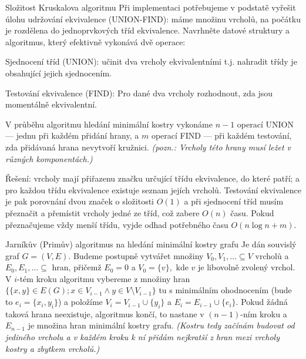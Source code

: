 \begin{vetaN}{Složitost Kruskalova algoritmu}
Při implementaci potřebujeme v podstatě vyřešit úlohu udržování ekvivalence (UNION-FIND): máme množinu vrcholů, na počátku je rozdělena do jednoprvkových tříd ekvivalence. Navrhněte datové struktury a algoritmus, který efektivně vykonává dvě operace:
\begin{penumerate}
\item Sjednocení tříd (UNION): učinit dva vrcholy ekvivalentními t.j. nahradit třídy je obsahující jejich sjednocením.
\item Testování ekvivalence (FIND): Pro dané dva vrcholy rozhodnout, zda jsou momentálně ekvivalentní.
\end{penumerate}
V průběhu algoritmu hledání minimální kostry vykonáme $n-1$ operací UNION --- jednu při každém přidání hrany, a $m$ operací FIND --- při každém testování, zda přidávaná hrana nevytvoří kružnici. \textit{(pozn.: Vrcholy této hrany musí ležet v různých komponentách.)}

Řešení: vrcholy mají přiřazenu značku určující třídu ekvivalence, do které patří; a pro každou třídu ekvivalence existuje seznam jejích vrcholů. Testování ekvivalence je pak porovnání dvou značek o složitosti $O(1)$ a při sjednocení tříd musím přeznačit a přemístit vrcholy jedné ze tříd, což zabere $O(n)$ času. Pokud přeznačujeme vždy menší třídu, vyjde odhad potřebného času $O(n \log n + m).$
\end{vetaN}

\begin{algoritmusN}{Jarníkův (Primův) algoritmus na hledání minimální kostry grafu}
Je dán souvislý graf $G=(V,E).$ Budeme postupně vytvářet množiny $V_0, V_1, \dots \subseteq V$ vrcholů a $E_0, E_1,\dots \subseteq$ hran, přičemž $E_0=0$ a $V_0=\{v\},$ kde $v$ je libovolně zvolený vrchol. V $i$-tém kroku algoritmu vybereme z množiny hran $\{\{x,y\} \in E(G); x \in V_{i-1} \land y \in V \setminus V_{i-1}\}$ tu s minimálním ohodnocením (bude to $e_i=\{x_i,y_i\}$) a položíme $V_i=V_{i-1} \cup \{y_i\}$ a $E_i=E_{i-1} \cup \{e_i\}.$ Pokud žádná taková hrana neexistuje, algoritmus končí, to nastane v $(n-1)$-ním kroku a $E_{n-1}$ je množina hran minimální kostry grafu. \textit{(Kostru tedy začínám budovat od jediného vrcholu a v každém kroku k ní přidám nejkratší z hran mezi vrcholy kostry a zbytkem vrcholů.)} 
\end{algoritmusN}

